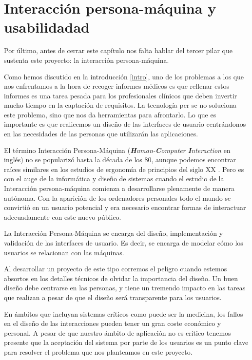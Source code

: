 \section{Interacción persona-máquina y usabilidadad}
Por último, antes de cerrar este capítulo nos falta hablar del tercer pilar que sustenta este proyecto: la interacción persona-máquina.\par
Como hemos discutido en la introducción \ref{intro}, uno de los problemas a los que nos enfrentamos a la hora de recoger informes médicos es que rellenar estos informes es una tarea pesada para los profesionales clínicos que deben invertir mucho tiempo en la captación de requisitos. La tecnología per se no soluciona este problema, sino que nos da herramientas para afrontarlo. Lo que es importante es que realicemos un diseño de las interfaces de usuario centrándonos en las necesidades de las personas que utilizarán las aplicaciones.\medskip\par
El término Interacción Persona-Máquina (\textit{\textbf{H}uman-\textbf{C}omputer \textbf{I}nteraction} en inglés) no se popularizó hasta la década de los 80, aunque podemos encontrar raíces similares en los estudios de ergonomía de principios del siglo XX \cite{dix2004human}. Pero es con el auge de la informática y diseño de sistemas cuando el estudio de la Interacción persona-máquina comienza a desarrollarse plenamente de manera autónoma. Con la aparición de los ordenadores personales todo el mundo se convirtió en un usuario potencial y era necesario encontrar formas de interactuar adecuadamente con este nuevo público. \par
La Interacción Persona-Máquina se encarga del diseño, implementación y validación de las interfaces de usuario. Es decir, se encarga de modelar cómo los usuarios se relacionan con las máquinas.\medskip\par
Al desarrollar un proyecto de este tipo corremos el peligro cuando estemos absortos en los detalles técnicos de olvidar la importancia del diseño. Un buen diseño debe centrarse en las personas, y tiene un tremendo impacto en las tareas que realizan a pesar de que el diseño será transparente para los usuarios.\par
En ámbitos que incluyan sistemas críticos como puede ser la medicina, los fallos en el diseño de las interacciones pueden tener un gran coste económico y personal. A pesar de que nuestro ámbito de aplicación no es crítico tenemos presente que la aceptación del sistema por parte de los usuarios es un punto clave para resolver el problema que nos planteamos en este proyecto.\medskip \par
